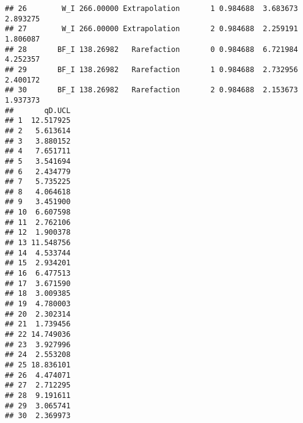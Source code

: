 \documentclass[
]{article}
\newenvironment{Shaded}{\begin{snugshade}}{\end{snugshade}}
\newcommand{\AttributeTok}[1]{\textcolor[rgb]{0.77,0.63,0.00}{#1}}
\newcommand{\CommentTok}[1]{\textcolor[rgb]{0.56,0.35,0.01}{\textit{#1}}}
\newcommand{\DecValTok}[1]{\textcolor[rgb]{0.00,0.00,0.81}{#1}}
\newcommand{\FunctionTok}[1]{\textcolor[rgb]{0.00,0.00,0.00}{#1}}
\newcommand{\NormalTok}[1]{#1}
\newcommand{\OtherTok}[1]{\textcolor[rgb]{0.56,0.35,0.01}{#1}}
\newcommand{\SpecialCharTok}[1]{\textcolor[rgb]{0.00,0.00,0.00}{#1}}
\newcommand{\StringTok}[1]{\textcolor[rgb]{0.31,0.60,0.02}{#1}}
\begin{document}
\begin{verbatim}
## 26        W_I 266.00000 Extrapolation       1 0.984688  3.683673 2.893275
## 27        W_I 266.00000 Extrapolation       2 0.984688  2.259191 1.806087
## 28       BF_I 138.26982   Rarefaction       0 0.984688  6.721984 4.252357
## 29       BF_I 138.26982   Rarefaction       1 0.984688  2.732956 2.400172
## 30       BF_I 138.26982   Rarefaction       2 0.984688  2.153673 1.937373
##       qD.UCL
## 1  12.517925
## 2   5.613614
## 3   3.880152
## 4   7.651711
## 5   3.541694
## 6   2.434779
## 7   5.735225
## 8   4.064618
## 9   3.451900
## 10  6.607598
## 11  2.762106
## 12  1.900378
## 13 11.548756
## 14  4.533744
## 15  2.934201
## 16  6.477513
## 17  3.671590
## 18  3.009385
## 19  4.780003
## 20  2.302314
## 21  1.739456
## 22 14.749036
## 23  3.927996
## 24  2.553208
## 25 18.836101
## 26  4.474071
## 27  2.712295
## 28  9.191611
## 29  3.065741
## 30  2.369973
\end{verbatim}

\begin{Shaded}
\end{Shaded}

\begin{Shaded}
\end{Shaded}
\end{document}
